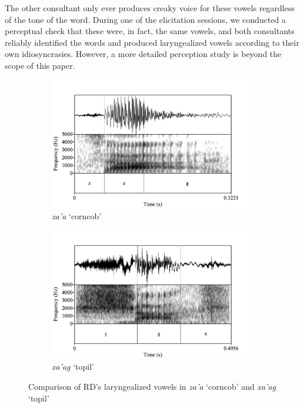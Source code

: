 \documentclass[12pt, letterpaper]{article}
\begin{document}
The other consultant only ever produces creaky voice for these vowels regardless of the tone of the word. During one of the elicitation sessions, we conducted a perceptual check that these were, in fact, the same vowels, and both consultants reliably identified the words and produced laryngealized vowels according to their own idiosyncrasies. However, a more detailed perception study is beyond the scope of this paper. 
\begin{figure}[!h]
	\centering
	\begin{subfigure}{.5\textwidth}
		\centering
		\includegraphics[width=\linewidth]{Images/RD_za'a.png}
		\caption{\textit{za'a} `corncob'}
		\label{fig:za'a}
	\end{subfigure}%
	\begin{subfigure}{.5\textwidth}
		\centering
		\includegraphics[width=\linewidth]{Images/RD_xa'ag.png}
		\caption{\textit{xa'ag} `topil'}
		\label{fig:xa'ag}
	\end{subfigure}
	\caption{Comparison of RD's laryngealized vowels in \textit{za'a} `corncob' and \textit{xa'ag} `topil'}
	\label{fig:RDLaryngeal}
\end{figure}
\end{document}
